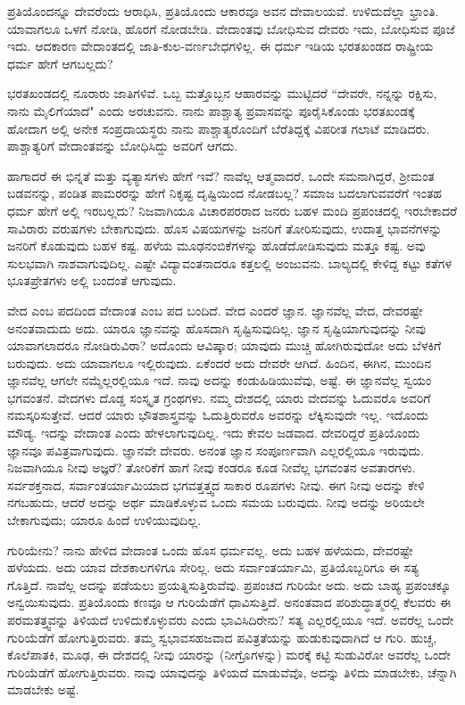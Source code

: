 ಪ್ರತಿಯೊಂದನ್ನೂ ದೇವರೆಂದು ಆರಾಧಿಸಿ, ಪ್ರತಿಯೊಂದು ಆಕಾರವೂ ಅವನ ದೇವಾಲಯವೆ. ಉಳಿದುದೆಲ್ಲಾ ಭ್ರಾಂತಿ. ಯಾವಾಗಲೂ ಒಳಗೆ ನೋಡಿ, ಹೊರಗೆ ನೋಡಬೇಡಿ. ವೇದಾಂತವು ಬೋಧಿಸುವ ದೇವರು ಇದು, ಬೋಧಿಸುವ ಪೂಜೆ ಇದು. ಆದಕಾರಣ ವೇದಾಂತದಲ್ಲಿ ಜಾತಿ-ಕುಲ-ವರ್ಣಬೇಧಗಳಿಲ್ಲ. ಈ ಧರ್ಮ ಇಡಿಯ ಭರತಖಂಡದ ರಾಷ್ಟ್ರೀಯ ಧರ್ಮ ಹೇಗೆ ಆಗಬಲ್ಲದು?

ಭರತಖಂಡದಲ್ಲಿ ನೂರಾರು ಜಾತಿಗಳಿವೆ. ಒಬ್ಬ ಮತ್ತೊಬ್ಬನ ಆಹಾರವನ್ನು ಮುಟ್ಟಿದರೆ “ದೇವರೇ, ನನ್ನನ್ನು ರಕ್ಷಿಸು, ನಾನು ಮೈಲಿಗೆಯಾದೆ" ಎಂದು ಅರಚುವನು. ನಾನು ಪಾಶ್ಚಾತ್ಯ ಪ್ರವಾಸವನ್ನು ಪೂರೈಸಿಕೊಂಡು ಭರತಖಂಡಕ್ಕೆ ಹೋದಾಗ ಅಲ್ಲಿ ಅನೇಕ ಸಂಪ್ರದಾಯಸ್ಥರು ನಾನು ಪಾಶ್ಚಾತ್ಯರೊಂದಿಗೆ ಬೆರೆತಿದ್ದಕ್ಕೆ ವಿಪರೀತ ಗಲಾಟೆ ಮಾಡಿದರು. ಪಾಶ್ಚಾತ್ಯರಿಗೆ ವೇದಾಂತವನ್ನು ಬೋಧಿಸಿದ್ದು ಅವರಿಗೆ ಆಗದು.

ಹಾಗಾದರೆ ಈ ಭಿನ್ನತೆ ಮತ್ತು ವ್ಯತ್ಯಾಸಗಳು ಹೇಗೆ ಇವೆ? ನಾವೆಲ್ಲ ಆತ್ಮವಾದರೆ, ಒಂದೇ ಸಮನಾಗಿದ್ದರೆ, ಶ‍್ರೀಮಂತ ಬಡವನನ್ನು, ಪಂಡಿತ ಪಾಮರರನ್ನು ಹೇಗೆ ನಿಕೃಷ್ಟ ದೃಷ್ಟಿಯಿಂದ ನೋಡಬಲ್ಲ? ಸಮಾಜ ಬದಲಾಗುವವರೆಗೆ ಇಂತಹ ಧರ್ಮ ಹೇಗೆ ಅಲ್ಲಿ ಇರಬಲ್ಲದು? ನಿಜವಾಗಿಯೂ ವಿಚಾರಪರರಾದ ಜನರು ಬಹಳ ಮಂದಿ ಪ್ರಪಂಚದಲ್ಲಿ ಇರಬೇಕಾದರೆ ಸಾವಿರಾರು ವರುಷಗಳು ಬೇಕಾಗುವುದು. ಹೊಸ ವಿಷಯಗಳನ್ನು ಜನರಿಗೆ ತೋರಿಸುವುದು, ಉದಾತ್ತ ಭಾವನೆಗಳನ್ನು ಜನರಿಗೆ ಕೊಡುವುದು ಬಹಳ ಕಷ್ಟ. ಹಳೆಯ ಮೂಢನಂಬಿಕೆಗಳನ್ನು ಹೊಡೆದೋಡಿಸುವುದು ಮತ್ತೂ ಕಷ್ಟ. ಅವು ಸುಲಭವಾಗಿ ನಾಶವಾಗುವುದಿಲ್ಲ. ಎಷ್ಟೇ ವಿದ್ಯಾವಂತನಾದರೂ ಕತ್ತಲಲ್ಲಿ ಅಂಜುವನು. ಬಾಲ್ಯದಲ್ಲಿ ಕೇಳಿದ್ದ ಕಟ್ಟು ಕತೆಗಳ ಭೂತಪ್ರೇತಗಳು ಅಲ್ಲಿ ಬಂದಂತೆ ಆಗುವುದು.

ವೇದ ಎಂಬ ಪದದಿಂದ ವೇದಾಂತ ಎಂಬ ಪದ ಬಂದಿದೆ. ವೇದ ಎಂದರೆ ಜ್ಞಾನ. ಜ್ಞಾನವೆಲ್ಲ ವೇದ, ದೇವರಷ್ಟೇ ಅನಂತವಾದುದು ಅದು. ಯಾರೂ ಜ್ಞಾನವನ್ನು ಹೊಸದಾಗಿ ಸೃಷ್ಟಿಸುವುದಿಲ್ಲ. ಜ್ಞಾನ ಸೃಷ್ಟಿಯಾಗುವುದನ್ನು ನೀವು ಯಾವಾಗಲಾದರೂ ನೋಡಿರುವಿರಾ? ಅದೊಂದು ಆವಿಷ್ಕಾರ; ಯಾವುದು ಮುಚ್ಚಿ ಹೋಗಿರುವುದೋ ಅದು ಬೆಳಕಿಗೆ ಬರುವುದು. ಅದು ಯಾವಾಗಲೂ ಇಲ್ಲಿರುವುದು. ಏಕೆಂದರೆ ಅದು ದೇವರೇ ಆಗಿದೆ. ಹಿಂದಿನ, ಈಗಿನ, ಮುಂದಿನ ಜ್ಞಾನವೆಲ್ಲ ಆಗಲೇ ನಮ್ಮೆಲ್ಲರಲ್ಲಿಯೂ ಇದೆ. ನಾವು ಅದನ್ನು ಕಂಡುಹಿಡಿಯುವೆವು, ಅಷ್ಟೆ. ಈ ಜ್ಞಾನವೆಲ್ಲ ಸ್ವಯಂ ಭಗವಂತನೆ. ವೇದಗಳು ದೊಡ್ಡ ಸಂಸ್ಕೃತ ಗ್ರಂಥಗಳು. ನಮ್ಮ ದೇಶದಲ್ಲಿ ಯಾರು ವೇದವನ್ನು ಓದುವರೊ ಅವರಿಗೆ ನಮಸ್ಕರಿಸುತ್ತೇವೆ. ಆದರೆ ಯಾರು ಭೌತಶಾಸ್ತ್ರವನ್ನು ಓದುತ್ತಿರುವರೊ ಅವರನ್ನು ಲೆಕ್ಕಿಸುವುದೇ ಇಲ್ಲ. ಇದೊಂದು ಮೌಡ್ಯ. ಇದನ್ನು ವೇದಾಂತ ಎಂದು ಹೇಳಲಾಗುವುದಿಲ್ಲ. ಇದು ಕೇವಲ ಜಡವಾದ. ದೇವರಿದ್ದರೆ ಪ್ರತಿಯೊಂದು ಜ್ಞಾನವೂ ಪವಿತ್ರವಾಗುವುದು. ಜ್ಞಾನವೇ ದೇವರು. ಅನಂತ ಜ್ಞಾನ ಸಂಪೂರ್ಣವಾಗಿ ಎಲ್ಲರಲ್ಲಿಯೂ ಇರುವುದು. ನಿಜವಾಗಿಯೂ ನೀವು ಅಜ್ಞರೆ? ತೋರಿಕೆಗೆ ಹಾಗೆ ನೀವು ಕಂಡರೂ ಕೂಡ ನೀವೆಲ್ಲ ಭಗವಂತನ ಅವತಾರಗಳು. ಸರ್ವಶಕ್ತನಾದ, ಸರ್ವಾಂತರ್ಯಾಮಿಯಾದ ಭಗವತ್ತತ್ತ್ವದ ಸಾಕಾರ ರೂಪಗಳು ನೀವು. ಈಗ ನೀವು ಅದನ್ನು ಕೇಳಿ ನಗಬಹುದು, ಆದರೆ ಅದನ್ನು ಅರ್ಥ ಮಾಡಿಕೊಳ್ಳುವ ಒಂದು ಸಮಯ ಬರುವುದು. ನೀವು ಅದನ್ನು ಅರಿಯಲೇ ಬೇಕಾಗುವುದು; ಯಾರೂ ಹಿಂದೆ ಉಳಿಯುವುದಿಲ್ಲ.

ಗುರಿಯೇನು? ನಾನು ಹೇಳಿದ ವೇದಾಂತ ಒಂದು ಹೊಸ ಧರ್ಮವಲ್ಲ. ಅದು ಬಹಳ ಹಳೆಯದು, ದೇವರಷ್ಟೇ ಹಳೆಯದು. ಅದು ಯಾವ ದೇಶಕಾಲಗಳಿಗೂ ಸೇರಿಲ್ಲ. ಅದು ಸರ್ವಾಂತರ್ಯಾಮಿ, ಪ್ರತಿಯೊಬ್ಬರಿಗೂ ಈ ಸತ್ಯ ಗೊತ್ತಿದೆ. ನಾವೆಲ್ಲ ಅದನ್ನು ಪಡೆಯಲು ಪ್ರಯತ್ನಿಸುತ್ತಿರುವೆವು. ಪ್ರಪಂಚದ ಗುರಿಯೇ ಅದು. ಅದು ಬಾಹ್ಯ ಪ್ರಪಂಚಕ್ಕೂ ಅನ್ವಯಿಸುವುದು. ಪ್ರತಿಯೊಂದು ಕಣವೂ ಆ ಗುರಿಯೆಡೆಗೆ ಧಾವಿಸುತ್ತಿದೆ. ಅನಂತವಾದ ಪರಿಶುದ್ಧಾತ್ಮರಲ್ಲಿ ಕೆಲವರು ಈ ಪರಮತತ್ತ್ವವನ್ನು ತಿಳಿಯದೆ ಉಳಿದುಕೊಳ್ಳುವರು ಎಂದು ಭಾವಿಸಿದಿರೇನು? ಸತ್ಯ ಎಲ್ಲರಲ್ಲಿಯೂ ಇದೆ. ಅವರೆಲ್ಲ ಒಂದೇ ಗುರಿಯೆಡೆಗೆ ಹೋಗುತ್ತಿರುವರು. ತಮ್ಮ ಸ್ವಭಾವಸಹಜವಾದ ಪವಿತ್ರತೆಯನ್ನು ಹುಡುಕುವುದಾಗಿದೆ ಆ ಗುರಿ. ಹುಚ್ಚ, ಕೊಲೆಪಾತಕಿ, ಮೂಢ, ಈ ದೇಶದಲ್ಲಿ ನೀವು ಯಾರನ್ನು (ನೀಗ್ರೊಗಳನ್ನು) ಮರಕ್ಕೆ ಕಟ್ಟಿ ಸುಡುವಿರೋ ಅವರೆಲ್ಲ ಒಂದೇ ಗುರಿಯೆಡೆಗೆ ಹೋಗುತ್ತಿರುವರು. ನಾವು ಯಾವುದನ್ನು ತಿಳಿಯದೆ ಮಾಡುವೆವೊ, ಅದನ್ನು ತಿಳಿದು ಮಾಡಬೇಕು, ಚೆನ್ನಾಗಿ ಮಾಡಬೇಕು ಅಷ್ಟೆ.

